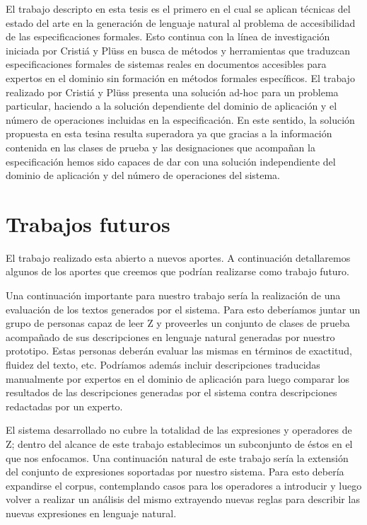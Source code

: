 El trabajo descripto en esta tesis es el primero en el cual se aplican técnicas del estado del arte en la generación de lenguaje natural al problema de accesibilidad de las especificaciones formales. Esto continua con la línea de investigación iniciada por Cristiá y Plüss \cite{cristia_pluss} en busca de métodos y herramientas que traduzcan especificaciones formales de sistemas reales en documentos accesibles para expertos en el dominio sin formación en métodos formales específicos. El trabajo realizado por Cristiá y Plüss \cite{cristia_pluss} presenta una solución ad-hoc para un problema particular, haciendo a la solución dependiente del dominio de aplicación y el número de operaciones incluidas en la especificación. En este sentido, la solución propuesta en esta tesina resulta superadora ya que gracias a la información contenida en las clases de prueba y las designaciones que acompañan la especificación hemos sido capaces de dar con una solución independiente del dominio de aplicación y del número de operaciones del sistema. 

\section*{Trabajos futuros}

El trabajo realizado esta abierto a nuevos aportes. A continuación detallaremos algunos de los aportes que creemos que podrían realizarse como trabajo futuro.

Una continuación importante para nuestro trabajo sería la realización de una evaluación de los textos generados por el sistema. Para esto deberíamos juntar un grupo de personas capaz de leer Z y proveerles un conjunto de clases de prueba acompañado de sus descripciones en lenguaje natural generadas por nuestro prototipo. Estas personas deberán evaluar las mismas en términos de exactitud, fluidez del texto, etc. Podríamos además incluir descripciones traducidas manualmente por expertos en el dominio de aplicación para luego comparar los resultados de las descripciones generadas por el sistema contra descripciones redactadas por un experto.

El sistema desarrollado no cubre la totalidad de las expresiones y operadores de Z; dentro del alcance de este trabajo establecimos un subconjunto de éstos en el que nos enfocamos. Una continuación natural de este trabajo sería la extensión del conjunto de expresiones soportadas por nuestro sistema. Para esto debería expandirse el corpus, contemplando casos para los operadores a introducir y luego volver a realizar un análisis del mismo extrayendo nuevas reglas para describir las nuevas expresiones en lenguaje natural. 

